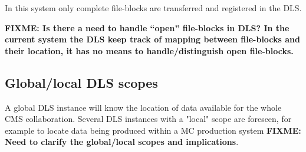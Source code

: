\documentclass[pdftex]{cmspaper}
\begin{document}
In this system only complete file-blocks are transferred and 
registered in the DLS. 

{\bf FIXME: Is there a need to handle ``open'' file-blocks in DLS? In the current system the DLS keep track of mapping between file-blocks and their location, it has no means to handle/distinguish open file-blocks.}

\subsection{Global/local DLS scopes}

A global DLS instance will know the location of data available for the 
whole CMS collaboration.
Several DLS instances with a "local" scope are foreseen, for example 
to locate data being produced within a MC production system
{\bf FIXME: Need to clarify the global/local scopes and implications}.
\end{document}

